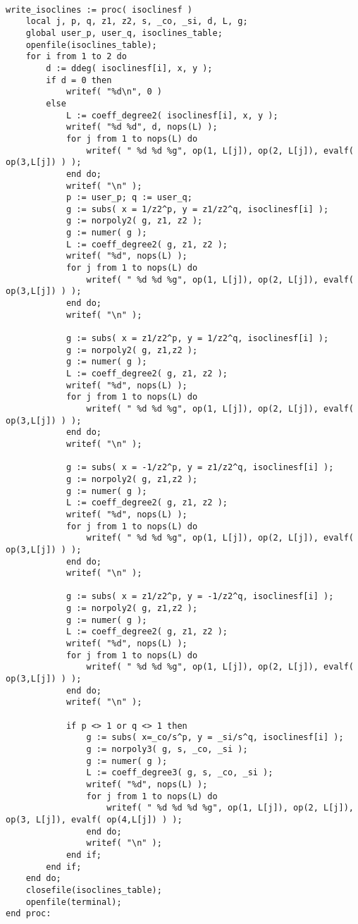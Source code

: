 \documentclass[a4paper,10pt]{article}
\begin{document}
\begin{lstlisting}[name=writelog3]

write_isoclines := proc( isoclinesf )
    local j, p, q, z1, z2, s, _co, _si, d, L, g;
    global user_p, user_q, isoclines_table;
    openfile(isoclines_table);
    for i from 1 to 2 do
        d := ddeg( isoclinesf[i], x, y );
        if d = 0 then
            writef( "%d\n", 0 )
        else
            L := coeff_degree2( isoclinesf[i], x, y );
            writef( "%d %d", d, nops(L) );
            for j from 1 to nops(L) do
                writef( " %d %d %g", op(1, L[j]), op(2, L[j]), evalf( op(3,L[j]) ) );
            end do;
            writef( "\n" );
            p := user_p; q := user_q;
            g := subs( x = 1/z2^p, y = z1/z2^q, isoclinesf[i] );
            g := norpoly2( g, z1, z2 );
            g := numer( g );
            L := coeff_degree2( g, z1, z2 );
            writef( "%d", nops(L) );
            for j from 1 to nops(L) do
                writef( " %d %d %g", op(1, L[j]), op(2, L[j]), evalf( op(3,L[j]) ) );
            end do;
            writef( "\n" );

            g := subs( x = z1/z2^p, y = 1/z2^q, isoclinesf[i] );
            g := norpoly2( g, z1,z2 );
            g := numer( g );
            L := coeff_degree2( g, z1, z2 );
            writef( "%d", nops(L) );
            for j from 1 to nops(L) do
                writef( " %d %d %g", op(1, L[j]), op(2, L[j]), evalf( op(3,L[j]) ) );
            end do;
            writef( "\n" );

            g := subs( x = -1/z2^p, y = z1/z2^q, isoclinesf[i] );
            g := norpoly2( g, z1,z2 );
            g := numer( g );
            L := coeff_degree2( g, z1, z2 );
            writef( "%d", nops(L) );
            for j from 1 to nops(L) do
                writef( " %d %d %g", op(1, L[j]), op(2, L[j]), evalf( op(3,L[j]) ) );
            end do;
            writef( "\n" );

            g := subs( x = z1/z2^p, y = -1/z2^q, isoclinesf[i] );
            g := norpoly2( g, z1,z2 );
            g := numer( g );
            L := coeff_degree2( g, z1, z2 );
            writef( "%d", nops(L) );
            for j from 1 to nops(L) do
                writef( " %d %d %g", op(1, L[j]), op(2, L[j]), evalf( op(3,L[j]) ) );
            end do;
            writef( "\n" );

            if p <> 1 or q <> 1 then
                g := subs( x=_co/s^p, y = _si/s^q, isoclinesf[i] );
                g := norpoly3( g, s, _co, _si );
                g := numer( g );
                L := coeff_degree3( g, s, _co, _si );
                writef( "%d", nops(L) );
                for j from 1 to nops(L) do
                    writef( " %d %d %d %g", op(1, L[j]), op(2, L[j]), op(3, L[j]), evalf( op(4,L[j]) ) );
                end do;
                writef( "\n" );
            end if;
        end if;
    end do;
    closefile(isoclines_table);
    openfile(terminal);
end proc:
\end{lstlisting}
\end{document}

